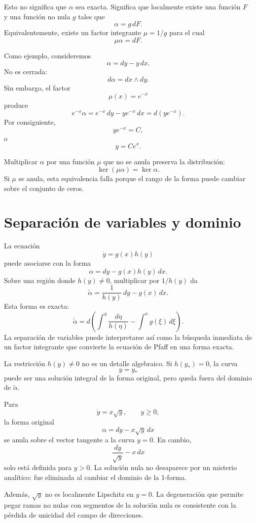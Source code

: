 \documentclass[12pt,a4paper]{article}
\begin{document}
	Esto no significa que \(\alpha\) sea exacta. Significa que localmente existe una función \(F\) y una función no nula \(g\) tales que
	\[
	\alpha=g\,dF.
	\]
Equivalentemente, existe un factor integrante \(\mu=1/g\) para el cual
	\[
	\mu\alpha=dF.
	\]

	Como ejemplo, consideremos
	\[
	\alpha=dy-y\,dx.
	\]
No es cerrada:
	\[
	d\alpha=dx\wedge dy.
	\]
Sin embargo, el factor
	\[
	\mu(x)=e^{-x}
	\]
produce
	\[
	e^{-x}\alpha
	=
	e^{-x}\,dy-ye^{-x}\,dx
	=
	d\left(ye^{-x}\right).
	\]
Por consiguiente,
	\[
	ye^{-x}=C,
	\]
o
	\[
	y=Ce^x.
	\]

	Multiplicar \(\alpha\) por una función \(\mu\) que no se anula preserva la distribución:
	\[
	\ker(\mu\alpha)=\ker\alpha.
	\]
Si \(\mu\) se anula, esta equivalencia falla porque el rango de la forma puede cambiar sobre el conjunto de ceros.

	\clearpage
	\section{Separación de variables y dominio}

	La ecuación
	\[
	\dot{y}=g(x)h(y)
	\]
puede asociarse con la forma
	\[
	\alpha=dy-g(x)h(y)\,dx.
	\]
Sobre una región donde \(h(y)\neq 0\), multiplicar por \(1/h(y)\) da
	\[
	\widetilde{\alpha}
	=
	\frac{1}{h(y)}\,dy-g(x)\,dx.
	\]
Esta forma es exacta:
	\[
	\widetilde{\alpha}
	=
	d\left(
	\int^y\frac{d\eta}{h(\eta)}
	-
	\int^x g(\xi)\,d\xi
	\right).
	\]
La separación de variables puede interpretarse así como la búsqueda inmediata de un factor integrante que convierte la ecuación de Pfaff en una forma exacta.

	La restricción \(h(y)\neq 0\) no es un detalle algebraico. Si \(h(y_\ast)=0\), la curva
	\[
	y=y_\ast
	\]
puede ser una solución integral de la forma original, pero queda fuera del dominio de \(\widetilde{\alpha}\).

	Para
	\[
	\dot{y}=x\sqrt{y},
	\qquad y\geq 0,
	\]
la forma original
	\[
	\alpha=dy-x\sqrt{y}\,dx
	\]
se anula sobre el vector tangente a la curva \(y=0\). En cambio,
	\[
	\frac{dy}{\sqrt{y}}-x\,dx
	\]
solo está definida para \(y>0\). La solución nula no desaparece por un misterio analítico: fue eliminada al cambiar el dominio de la 1-forma.

	Además, \(\sqrt{y}\) no es localmente Lipschitz en \(y=0\). La degeneración que permite pegar ramas no nulas con segmentos de la solución nula es consistente con la pérdida de unicidad del campo de direcciones.
\end{document}
